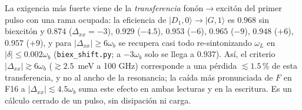 \documentclass[11pt,a4paper]{article}
\newcommand{\ket}[1]{|#1\rangle}
\newcommand{\wb}{\omega_b}
\newcommand{\Dxx}{\Delta_{xx}}
\begin{document}
La exigencia más fuerte viene de la \emph{transferencia} fonón$\to$excitón del primer pulso con una rama ocupada: la eficiencia de $\ket{D_1,0}\to\ket{G,1}$ es $0.968$ sin biexcitón y $0.874$ ($\Dxx=-3$), $0.929$ ($-4.5$), $0.953$ ($-6$), $0.965$ ($-9$), $0.948$ ($+6$), $0.957$ ($+9$), y para $|\Dxx|\ge6\wb$ se recupera casi todo re-sintonizando $\omega_L$ en $|\delta|\le0.002\wb$ (\texttt{biex\_shift.py}; a $-3\wb$ solo se llega a $0.937$). Así, el criterio $|\Dxx|\gtrsim6\wb$ ($\gtrsim2.5$~meV a 100 GHz) corresponde a una pérdida $\lesssim1.5$\,\% de esta transferencia, y no al ancho de la resonancia; la caída más pronunciada de $F$ en F16 a $|\Dxx|\lesssim4.5\wb$ suma este efecto en ambas lecturas y en la escritura. Es un cálculo cerrado de un pulso, sin disipación ni carga.

\end{document}
